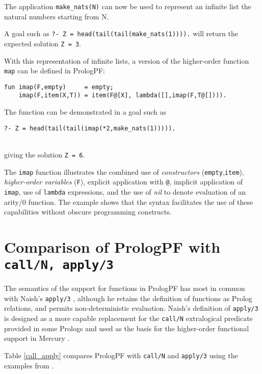 The application \texttt{make\_{}nats(N)} can now be used to represent an
infinite list the natural numbers starting from N.

A goal such as \texttt{?- Z = head(tail(tail(make\_{}nats(1)))).} will
return the expected solution \texttt{Z = 3}.

With this representation of infinite lists, a version of the
higher-order function \texttt{map} can be defined in PrologPF:
\begin{verbatim}
fun imap(F,empty)     = empty;
    imap(F,item(X,T)) = item(F@[X], lambda([],imap(F,T@[]))).
\end{verbatim}
The function can be demonstrated in a goal such as\\
\centerline{\texttt{?- Z = head(tail(tail(imap(*2,make\_{}nats(1))))).}}\\
giving the solution \texttt{Z = 6}.

The \texttt{imap} function illustrates the combined use of
\textit{constructors} (\texttt{empty},\texttt{item}), \textit{higher-order
variables} (\texttt{F}), explicit application with \texttt{@}, implicit
application of \texttt{imap}, use of \texttt{lambda} expressions, and the
use of \textit{nil} to denote evaluation of an arity/0 function.
The example shows that the syntax facilitates the use of these capabilities
without obscure programming constructs.


\section{Comparison of PrologPF with \texttt{call/N, apply/3}} %

The semantics of the support for functions in PrologPF has most in
common with Naish's \texttt{apply/3} \cite{Nai96}, although he retains the
definition of functions as Prolog relations, and permits non-deterministic
evaluation.  Naish's definition of \texttt{apply/3} is designed as a more
capable replacement for the \texttt{call/N} extralogical predicate provided
in some Prologs and used as the basis for the higher-order functional
support in Mercury \cite{SHC95}.

Table \ref{call_apply} compares PrologPF with \texttt{call/N} and \texttt{apply/3}
using the examples from \cite{Nai96}.

